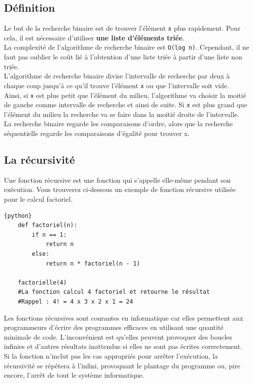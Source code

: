 \subsection{Définition}

Le but de la recherche binaire est de trouver l'élément \lstinline{x} plus rapidement. Pour cela, il est nécessaire d'utiliser \textbf{une liste d'éléments triée}.\\

La complexité de l'algorithme de recherche binaire est \lstinline{O(log n)}. Cependant, il ne faut pas oublier le coût lié à l'obtention d'une liste triée à partir d'une liste non triée.\\

L'algorithme de recherche binaire divise l'intervalle de recherche par deux à chaque coup jusqu'à ce qu'il trouve l'élément \lstinline{x} ou que l'intervalle soit vide.\\

Ainsi, si \lstinline{x} est plus petit que l'élément du milieu, l'algorithme va choisir la moitié de gauche comme intervalle de recherche et ainsi de suite. Si \lstinline{x} est plus grand que l'élément du milieu la recherche va se faire dans la moitié droite de l'intervalle.\\

La recherche binaire regarde les comparaisons d'ordre, alors que la recherche séquentielle regarde les comparaisons d'égalité pour trouver x.\\

\subsection{La récursivité}

Une fonction récursive est une fonction qui s'appelle elle-même pendant son exécution. Vous trouverez ci-dessous un exemple de fonction récursive utilisée pour le calcul factoriel.

\begin{lstlisting}{python}
    def factoriel(n):
        if n == 1:
            return n
        else:
            return n * factoriel(n - 1)
            
    factorielle(4)
    #La fonction calcul 4 factoriel et retourne le résultat 
    #Rappel : 4! = 4 x 3 x 2 x 1 = 24
\end{lstlisting}

Les fonctions récursives sont courantes en informatique car elles permettent aux programmeurs d'écrire des programmes efficaces en utilisant une quantité minimale de code. L'inconvénient est qu'elles peuvent provoquer des boucles infinies et d'autres résultats inattendus si elles ne sont pas écrites correctement. Si la fonction n'inclut pas les cas appropriés pour arrêter l'exécution, la récursivité se répétera à l'infini, provoquant le plantage du programme ou, pire encore, l'arrêt de tout le système informatique.\\
   
